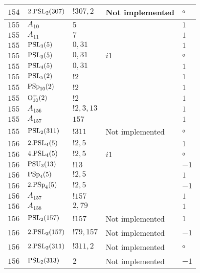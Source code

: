 \documentclass[a4paper, 11pt]{article}
\begin{document}
\begin{longtable}{lllll}
        $ 154 $ & $ 2.{\rm PSL}_{2}(307) $ & $ !307, 2 $ &  Not implemented &  $\circ$ \\ \hline
        $ 155 $ & $ A_{10} $ & $ 5 $ & $ ~ $ & $ 1$ \\ \hline
        $ 155 $ & $ A_{11} $ & $ 7 $ & $ ~ $ & $ 1$ \\ \hline
        $ 155 $ & $ {\rm PSL}_{3}(5) $ & $ 0,31 $ & $ ~ $ & $ 1$ \\ \hline
        $ 155 $ & $ {\rm PSL}_{3}(5) $ & $ 0,31 $ & $ i1 $ &  $\circ$ \\ \hline
        $ 155 $ & $ {\rm PSL}_{4}(5) $ & $ 0,31 $ & $ ~ $ & $ 1$ \\ \hline
        $ 155 $ & $ {\rm PSL}_{5}(2) $ & $ ! 2 $ & $ ~ $ & $ 1$ \\ \hline
        $ 155 $ & $ {\rm PSp}_{10}(2) $ & $ ! 2 $ & $ ~ $ & $ 1$ \\ \hline
        $ 155 $ & $ {\rm O}_{10}^+(2) $ & $ ! 2 $ & $ ~ $ & $ 1$ \\ \hline
        $ 155 $ & $ A_{156} $ & $ !2, 3, 13 $ & $ ~ $ & $ 1$ \\ \hline
        $ 155 $ & $ A_{157} $ & $ 157 $ & $ ~ $ & $ 1$ \\ \hline
        $ 155 $ & $ {\rm PSL}_{2}(311) $ & $ !311 $ &  Not implemented &  $\circ$ \\ \hline
        $ 156 $ & $ 2.{\rm PSL}_{4}(5) $ & $ ! 2,5 $ & $ ~ $ & $ 1$ \\ \hline
        $ 156 $ & $ 4.{\rm PSL}_{4}(5) $ & $ ! 2,5 $ & $ i1 $ &  $\circ$ \\ \hline
        $ 156 $ & $ {\rm PSU}_{3}(13) $ & $ ! 13 $ & $ ~ $ & $ -1$ \\ \hline
        $ 156 $ & $ {\rm PSp}_{4}(5) $ & $ ! 2,5 $ & $ ~ $ & $ 1$ \\ \hline
        $ 156 $ & $ 2.{\rm PSp}_{4}(5) $ & $ ! 2,5 $ & $ ~ $ & $ -1$ \\ \hline
        $ 156 $ & $ A_{157} $ & $ !157 $ & $ ~ $ & $ 1$ \\ \hline
        $ 156 $ & $ A_{158} $ & $ 2, 79 $ & $ ~ $ & $ 1$ \\ \hline
        $ 156 $ & $ {\rm PSL}_{2}(157) $ & $ !157 $ &  Not implemented & $ 1$ \\ \hline
        $ 156 $ & $ 2.{\rm PSL}_{2}(157) $ & $ !79, 157 $ &  Not implemented & $ -1$ \\ \hline
        $ 156 $ & $ 2.{\rm PSL}_{2}(311) $ & $ !311, 2 $ &  Not implemented &  $\circ$ \\ \hline
        $ 156 $ & $ {\rm PSL}_{2}(313) $ & $ 2 $ &  Not implemented & $ -1$ \\ \hline

\end{longtable}
\end{document}
